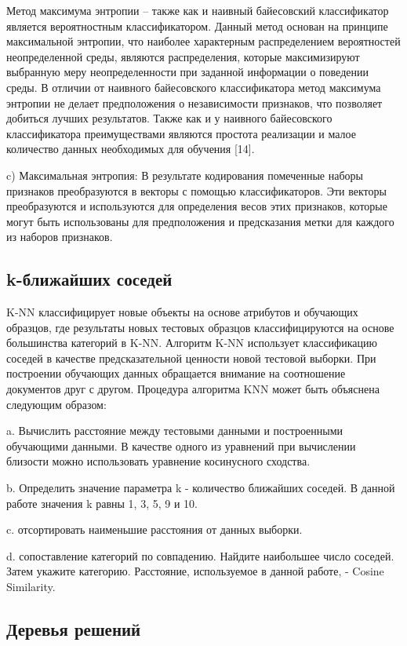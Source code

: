 Метод максимума энтропии – также как и наивный байесовский классификатор
является вероятностным классификатором. Данный метод основан на принципе
максимальной энтропии, что наиболее характерным распределением вероятностей
неопределенной среды, являются распределения, которые максимизируют выбранную
меру неопределенности при заданной информации о поведении среды. В отличии от
наивного байесовского классификатора метод максимума энтропии не делает
предположения о независимости признаков, что позволяет добиться лучших
результатов. Также как и у наивного байесовского классификатора преимуществами
являются простота реализации и малое количество данных необходимых для обучения
[14].~\cite{article9}

c) Максимальная энтропия: В результате кодирования помеченные наборы признаков
преобразуются в векторы с помощью классификаторов. Эти векторы преобразуются и
используются для определения весов этих признаков, которые могут быть
использованы для предположения и предсказания метки для каждого из наборов
признаков.~\cite{article18}

\subsection{k-ближайших соседей}

K-NN классифицирует новые объекты на основе атрибутов и обучающих образцов, где
результаты новых тестовых образцов классифицируются на основе большинства
категорий в K-NN. Алгоритм K-NN использует классификацию соседей в качестве
предсказательной ценности новой тестовой выборки.  При построении обучающих
данных обращается внимание на соотношение документов друг с другом.  Процедура
алгоритма KNN может быть объяснена следующим образом:

a. Вычислить расстояние между тестовыми данными и построенными обучающими
данными.  В качестве одного из уравнений при вычислении близости можно
использовать уравнение косинусного сходства.

b. Определить значение параметра k - количество ближайших соседей. В данной
работе значения k равны 1, 3, 5, 9 и 10. 

c. отсортировать наименьшие расстояния от данных выборки.

d. сопоставление категорий по совпадению. Найдите наибольшее число соседей.
Затем укажите категорию.  Расстояние, используемое в данной работе, - Cosine
Similarity.

\subsection{Деревья решений}

